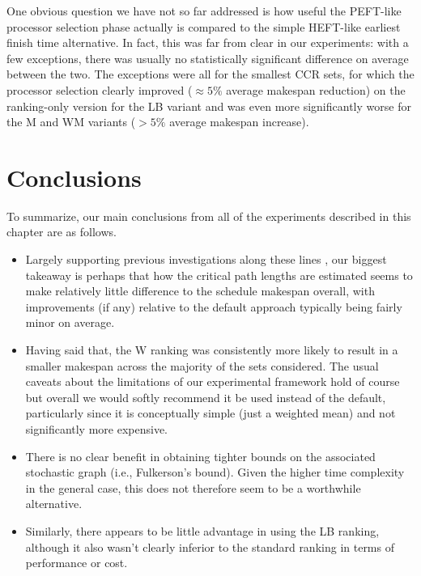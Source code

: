 \documentclass[12pt]{article}
\begin{document}
One obvious question we have not so far addressed is how useful the PEFT-like processor selection phase actually is compared to the simple HEFT-like earliest finish time alternative. In fact, this was far from clear in our experiments: with a few exceptions, there was usually no statistically significant difference on average between the two. The exceptions were all for the smallest CCR sets, for which the processor selection clearly improved ($\approx 5\%$ average makespan reduction) on the ranking-only version for the LB variant and was even more significantly worse for the M and WM variants ($> 5\%$ average makespan increase).  

\section{Conclusions}
\label{sect.conclusions}

To summarize, our main conclusions from all of the experiments described in this chapter are as follows.
\begin{itemize}
	\item Largely supporting previous investigations along these lines \cite{zhao03}, our biggest takeaway is perhaps that how the critical path lengths are estimated seems to make relatively little difference to the schedule makespan overall, with improvements (if any) relative to the default approach typically being fairly minor on average.
	\item Having said that, the W ranking was consistently more likely to result in a smaller makespan across the majority of the sets considered. The usual caveats about the limitations of our experimental framework hold of course but overall we would softly recommend it be used instead of the default, particularly since it is conceptually simple (just a weighted mean) and not significantly more expensive.
	\item There is no clear benefit in obtaining tighter bounds on the associated stochastic graph (i.e., Fulkerson's bound). Given the higher time complexity in the general case, this does not therefore seem to be a worthwhile alternative.    
	\item Similarly, there appears to be little advantage in using the LB ranking, although it also wasn't clearly inferior to the standard ranking in terms of performance or cost.  
        \end{itemize}
        


\end{document}
